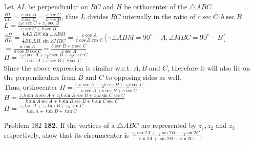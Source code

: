 \documentclass[aspectratio=169,8pt]{beamer}
\begin{document}
\begin{frame}
  Let $AL$ be perpendicular on $BC$ and $H$ be orthocenter of the $\triangle ABC$.\\
  \vspace*{0.2cm}
  $\frac{BL}{LC} = \frac{c\cos B}{b\cos C} = \frac{c\sec C}{b\sec B}$, thus $L$ divides $BC$ internally in the ratio of $c\sec
  C:b\sec B$\\
  $L = \frac{z_3c\sec C + z_2\sec B}{c\sec C + b\sec B}$\\
  \vspace*{0.2cm}
  $\frac{AH}{HL} = \frac{\frac{1}{2}AB.BN\sin\angle ABM}{\frac{1}{2}BL.LH.\sin\angle MBC} = \frac{c\cos A}{c\cos B\cos C}[\because \angle ABM = 90^\circ - A, \angle MBC = 90^\circ - B]$\\
  $= \frac{a\cos A}{a\cos B\cos C} = \frac{b\sec B + c\sec C}{a\sec A}$\\
  \vspace*{0.2cm}
  $H = \frac{z_1a\sec A + z_2b\sec B + z_3c\sec C}{a\sec A + b\sec B + c\sec C}$\\
  \vspace*{0.2cm}
  Since the above expression is similar w.r.t. $A, B$ and $C$, therefore it will also lie on the perpendiculars from $B$ and $C$ to
  opposing sides as well.\\
  \vspace*{0.2cm}
  Thus, orthocenter $H = \frac{z_1a\sec A + z_2b\sec B + z_3c\sec C}{a\sec A + b\sec B + c\sec C}$\\
  \vspace*{0.2cm}
  $H = \frac{z_1k\sin A\sec A + z_2k\sin B\sec B + z_3k\sin C\sec C}{k\sin A\sec A + k\sin B\sec B + k\sin C\sec C}$\\
  \vspace*{0.2cm}
  $H = \frac{z_1\tan A + z_2\tan B + z_3\tan C}{\tan A + \tan B + \tan C}$
\end{frame}
\begin{frame}{Problem 182}
  \textbf{182.} If the vertices of a $\triangle ABC$ are represented by $z_1, z_2$ and $z_3$ respectively, show that its
  circumcenter is $\frac{z_1\sin 2A + z_2\sin 2B + z_3\sin 2C}{\sin 2A + \sin 2B + \sin 2C}$.
\end{frame}
\end{document}
